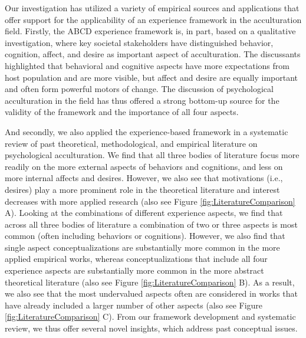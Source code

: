 \documentclass[man, 12pt, a4paper, mask]{apa7}
\begin{document}
Our investigation has utilized a variety of empirical sources and applications that offer support for the applicability of an experience framework in the acculturation field. Firstly, the ABCD experience framework is, in part, based on a qualitative investigation, where key societal stakeholders have distinguished behavior, cognition, affect, and desire as important aspect of acculturation. The discussants highlighted that behavioral and cognitive aspects have more expectations from host population and are more visible, but affect and desire are equally important and often form powerful motors of change. The discussion of psychological acculturation in the field has thus offered a strong bottom-up source for the validity of the framework and the importance of all four aspects.

And secondly, we also applied the experience-based framework in a systematic review of past theoretical, methodological, and empirical literature on psychological acculturation. We find that all three bodies of literature focus more readily on the more external aspects of behaviors and cognitions, and less on more internal affects and desires. However, we also see that motivations (i.e., desires) play a more prominent role in the theoretical literature and interest decreases with more applied research (also see Figure \ref{fig:LiteratureComparison} A). Looking at the combinations of different experience aspects, we find that across all three bodies of literature a combination of two or three aspects is most common (often including behaviors or cognitions). However, we also find that single aspect conceptualizations are substantially more common in the more applied empirical works, whereas conceptualizations that include all four experience aspects are substantially more common in the more abstract theoretical literature (also see Figure \ref{fig:LiteratureComparison} B). As a result, we also see that the most undervalued aspects often are considered in works that have already included a larger number of other aspects (also see Figure 
\ref{fig:LiteratureComparison} C). 
From our framework development and systematic review, we thus offer several novel insights, which address past conceptual issues.
\end{document}
